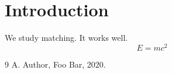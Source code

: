 \documentclass{article}
\begin{document}
\section{Introduction}
We study matching. It works well.
\begin{equation} E = mc^2 \end{equation}
\begin{thebibliography}{9}
 A. Author, Foo Bar, 2020.
\end{thebibliography}
\end{document}
